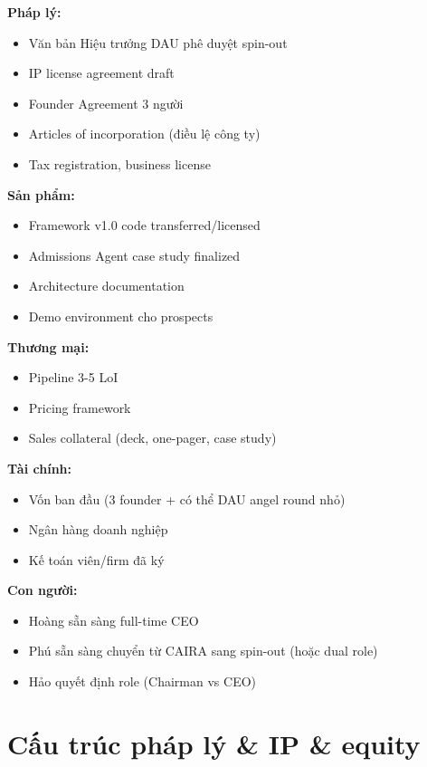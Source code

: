 \documentclass[11pt,a4paper]{article}
\begin{document}
\begin{tpl}[title=Pre-spinout readiness checklist]
\textbf{Pháp lý:}
\begin{itemize}
\item[$\square$] Văn bản Hiệu trưởng DAU phê duyệt spin-out
\item[$\square$] IP license agreement draft
\item[$\square$] Founder Agreement 3 người
\item[$\square$] Articles of incorporation (điều lệ công ty)
\item[$\square$] Tax registration, business license
\end{itemize}
\textbf{Sản phẩm:}
\begin{itemize}
\item[$\square$] Framework v1.0 code transferred/licensed
\item[$\square$] Admissions Agent case study finalized
\item[$\square$] Architecture documentation
\item[$\square$] Demo environment cho prospects
\end{itemize}
\textbf{Thương mại:}
\begin{itemize}
\item[$\square$] Pipeline 3-5 LoI
\item[$\square$] Pricing framework
\item[$\square$] Sales collateral (deck, one-pager, case study)
\end{itemize}
\textbf{Tài chính:}
\begin{itemize}
\item[$\square$] Vốn ban đầu (3 founder + có thể DAU angel round nhỏ)
\item[$\square$] Ngân hàng doanh nghiệp
\item[$\square$] Kế toán viên/firm đã ký
\end{itemize}
\textbf{Con người:}
\begin{itemize}
\item[$\square$] Hoàng sẵn sàng full-time CEO
\item[$\square$] Phú sẵn sàng chuyển từ CAIRA sang spin-out (hoặc dual role)
\item[$\square$] Hảo quyết định role (Chairman vs CEO)
\end{itemize}
\end{tpl}

\clearpage

\section{Cấu trúc pháp lý \& IP \& equity}
\end{document}
